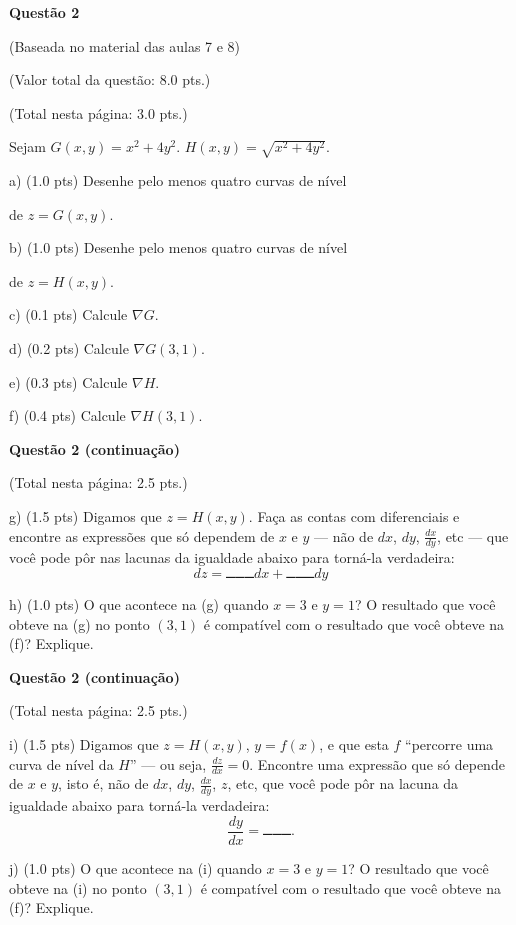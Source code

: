 \documentclass[oneside,12pt]{article}
\begin{document}
{\bf Questão 2}

(Baseada no material das aulas 7 e 8)

(Valor total da questão: 8.0 pts.)

(Total nesta página: 3.0 pts.)

\ssk

Sejam $G(x,y) = x^2 + 4y^2$. $H(x,y) = \sqrt{x^2 + 4y^2}$.

a) (1.0 pts) Desenhe pelo menos quatro curvas de nível

de $z=G(x,y)$.

b) (1.0 pts) Desenhe pelo menos quatro curvas de nível

de $z=H(x,y)$.

c) (0.1 pts) Calcule $∇G$.

d) (0.2 pts) Calcule $∇G(3,1)$.

e) (0.3 pts) Calcule $∇H$.

f) (0.4 pts) Calcule $∇H(3,1)$.

\msk


\newpage

{\bf Questão 2 (continuação)}

(Total nesta página: 2.5 pts.)

\ssk

g) (1.5 pts) Digamos que $z=H(x,y)$. Faça as contas com diferenciais e encontre
as expressões que só dependem de $x$ e $y$ --- não de $dx$, $dy$,
$\frac{dx}{dy}$, etc --- que você pode pôr nas lacunas da igualdade
abaixo para torná-la verdadeira:
%
$$dz = ▁▁▁dx + ▁▁▁dy$$

h) (1.0 pts) O que acontece na (g) quando $x=3$ e $y=1$? O resultado
que você obteve na (g) no ponto $(3,1)$ é compatível com o resultado
que você obteve na (f)? Explique.


\newpage

{\bf Questão 2 (continuação)}

(Total nesta página: 2.5 pts.)

\ssk

i) (1.5 pts) Digamos que $z=H(x,y)$, $y=f(x)$, e que esta $f$
``percorre uma curva de nível da $H$'' --- ou seja, $\frac{dz}{dx}=0$.
Encontre uma expressão que só depende de $x$ e $y$, isto é, não de
$dx$, $dy$, $\frac{dx}{dy}$, $z$, etc, que você pode pôr na lacuna da
igualdade abaixo para torná-la verdadeira:
%
$$\frac{dy}{dx} = ▁▁▁ .$$

j) (1.0 pts) O que acontece na (i) quando $x=3$ e $y=1$? O resultado
que você obteve na (i) no ponto $(3,1)$ é compatível com o resultado
que você obteve na (f)? Explique.







\end{document}
